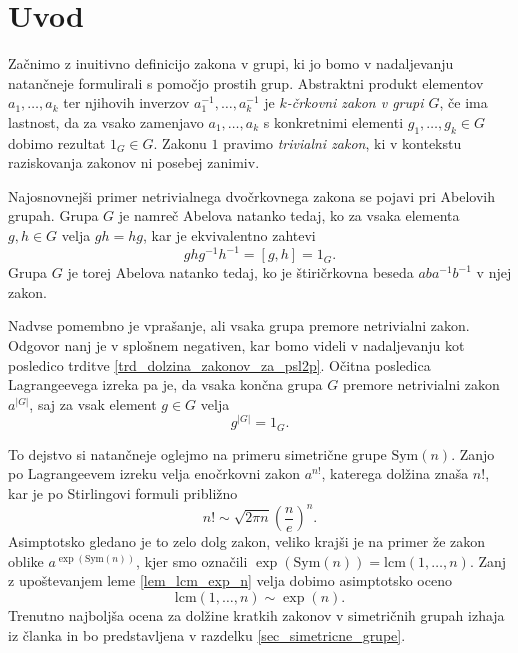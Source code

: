 \section{Uvod}
Začnimo z inuitivno definicijo zakona v grupi, ki jo bomo v nadaljevanju natančneje formulirali s pomočjo prostih grup.
Abstraktni produkt elementov $a_1, \ldots , a_k$ ter njihovih inverzov $a_1^{-1}, \ldots , a_k^{-1}$ je \emph{$k$-črkovni zakon v grupi $G$}, če ima lastnost, da za vsako zamenjavo $a_1, \ldots, a_k$ s konkretnimi
elementi $g_1, \ldots, g_k \in G$ dobimo rezultat $1_G\in G$. Zakonu $1$ pravimo \emph{trivialni zakon}, ki v kontekstu raziskovanja zakonov ni posebej zanimiv.

Najosnovnejši primer netrivialnega dvočrkovnega zakona se pojavi pri Abelovih grupah. Grupa $G$ je namreč Abelova natanko tedaj, ko za vsaka elementa $g, h \in  G$ velja $gh = hg$, kar je ekvivalentno
zahtevi \begin{equation*}
ghg^{-1}h^{-1} = [g,h] = 1_G.
\end{equation*}
Grupa $G$ je torej Abelova natanko tedaj, ko je štiričrkovna beseda $aba^{-1}b^{-1}$ v njej zakon. 

Nadvse pomembno je vprašanje, ali vsaka grupa premore netrivialni zakon. Odgovor nanj je v splošnem negativen, kar bomo videli v nadaljevanju kot posledico trditve \ref{trd_dolzina_zakonov_za_psl2p}. 
Očitna posledica Lagrangeevega izreka pa je, da vsaka končna grupa $G$ premore
netrivialni zakon $a^{\lvert G \rvert }$, saj za vsak element $g \in G$ velja  
\begin{equation*}
g^{\lvert G \rvert } = 1_G.
\end{equation*}  

To dejstvo si natančneje oglejmo na primeru simetrične grupe $\text{Sym}(n)$. Zanjo po Lagrangeevem izreku velja enočrkovni zakon $a^{n !}$, katerega dolžina znaša $n!$, kar je po Stirlingovi formuli približno
\begin{equation*}
n! \sim \sqrt{2 \pi n} \left( \frac{n}{e} \right)^{n}.
\end{equation*}  
Asimptotsko gledano je to zelo dolg zakon, veliko krajši je na primer že zakon oblike $a^{\exp(\text{Sym}(n))}$, kjer smo označili $\exp(\text{Sym}(n)) = \text{lcm}(1, \ldots, n)$. Zanj z upoštevanjem leme \ref{lem_lcm_exp_n} velja
dobimo asimptotsko oceno \begin{equation*}
\text{lcm}(1, \ldots ,n) \sim \exp(n).
\end{equation*}  
Trenutno najboljša ocena za dolžine kratkih zakonov v simetričnih grupah izhaja iz članka \cite{Kozma_Thom_2016} in bo predstavljena v razdelku \ref{sec_simetricne_grupe}.

